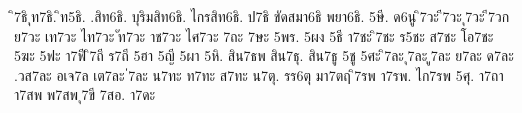 {ิ7ธิ
ุท7ธิ.
ิท5ธิ.
.สิท6ธิ.
บุริมสิท6ธิ.
ไกรสิท6ธิ.
ป7ธิ
ขัดสมา6ธิ
พยา6ธิ.
5ษี.
ด6นู
ิ7วะ
ี7วะ
ุ7วะ
ี7วก
ย7วะ
เท7วะ
ไท7วะ
ัท7วะ
าช7วะ
ไศ7วะ
7ถะ
7ษะ
5พร.
5ผง
5ธี
า7ชะ
ิ7ชะ
ร5ชะ
ส7ชะ
โอ7ชะ
5ฆะ
5ฟะ
า7ฟี
ิ7ถี
ร7ถี
5ฮา
5ญี
5ผา
5หิ.
สิน7ธพ
สิน7ธุ.
สิน7ธู
5ชู
5ศะ
ิ7ละ
ุ7ละ
ู7ละ
ย7ละ
ด7ละ
.วส7ละ
อเจ7ล
เต7ละ
่7ละ
น7ทะ
ท7ทะ
ส7ทะ
น7ตุ.
รร6ตุ
มา7ตฤ
ิ7รพ
า7รพ.
ไก7รพ
5ศุ.
า7ถา
า7สพ
พ7สพ
ุ7ขี
7สอ.
า7ดะ
}
